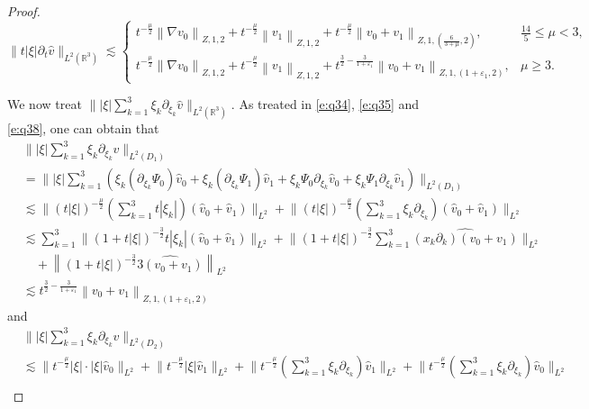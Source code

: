\documentclass[11pt,twoside]{article}
\newcommand{\R}{\mathbb R}
\newcommand{\p}{\partial}
\newcommand{\f}{\frac}
\newcommand{\ds}{\displaystyle}
\theoremstyle{plain}
\theoremstyle{definition}
\theoremstyle{remark}
\numberwithin{equation}{section}
\begin{document}
\begin{proof}
\begin{equation}\label{e:q83}
\|t|\xi|\p_t\hat{v}\|_{L^2(\R^3)}\lesssim \begin{cases}t^{-\f{\mu}{2}}\left\|\nabla v_0\right\|_{Z, 1,  2}+t^{-\f{\mu}{2}}\left\| v_1\right\|_{Z, 1,  2}+t^{-\f{\mu}{2}}\left\|v_0+v_1\right\|_{Z, 1,  (\f{6}{3+\mu},2)}, &  \f{14}{5}\leq\mu<3,  \\ t^{-\f{\mu}{2}}\left\|\nabla v_0\right\|_{Z, 1,  2}+t^{-\f{\mu}{2}}\left\| v_1\right\|_{Z, 1,  2}+t^{\f32-\f{3}{1+\varepsilon_1}}\left\|v_0+v_1\right\|_{Z, 1,  (1+\varepsilon_1,2)},
&  \mu\geq3.\end{cases}
\end{equation}


We now treat $\||\xi|\ds\sum_{k=1}^3\xi_k\p_{\xi_k}\hat{v}\|_{L^2(\R^3)}$.
As treated in \eqref{e:q34}, \eqref{e:q35} and \eqref{e:q38}, one can obtain that
\begin{equation}\label{e:q84}
\begin{aligned}
&\||\xi|\ds\sum_{k=1}^3\xi_k\p_{\xi_k}\hat{v}\|_{L^2(D_1)}
\\
&=\big\||\xi|  \ds\sum_{k=1}^{3}\left( \xi_k (\partial_{\xi_k} \Psi_0) \hat{v}_0
+ \xi_k (\partial_{\xi_k} \Psi_1) \hat{v}_1
+ \xi_k \Psi_0 \partial_{\xi_k} \hat{v}_0
+ \xi_k \Psi_1 \partial_{\xi_k} \hat{v}_1\right)\big\|_{L^2(D_1)}\\
&\lesssim \big\|(t|\xi|)^{-\frac{\mu}{2}}(\ds\sum_{k=1}^3t|\xi_k|)(\hat{v}_{0}+\hat{v}_{1})\big\|_{L^{2}}+ \big\|(t|\xi|)^{-\f{\mu}{2}}(\ds\sum_{k=1}^3\xi_k\p_{\xi_k})(\hat{v}_{0}+\hat{v}_{1})\big\|_{L^{2}}\\
& \lesssim \ds\sum_{k=1}^3 \big\|(1+t|\xi|)^{-\f{3}{2}}t|\xi_k|(\hat{v}_{0}+\hat{v}_{1})\big\|_{L^{2}}+
\big\|(1+t|\xi|)^{-\f{3}{2}}\ds\sum_{k=1}^3\widehat{(x_k\p_k)(v_0+v_1)}\big\|_{L^{2}}\\
&\quad+ \left\|(1+t|\xi|)^{-\f{3}{2}}\widehat{3(v_0+v_1)}\right\|_{L^{2}}\\
&\lesssim  t^{\f32-\f{3}{1+\varepsilon_1}}\left\|v_0+v_1\right\|_{Z, 1,(1+\varepsilon_1, 2)}
\end{aligned}
\end{equation}
and
\begin{equation}\label{e:q85}
\begin{aligned}
&\||\xi|\ds\sum_{k=1}^3\xi_k\p_{\xi_k}\hat{v}\|_{L^2(D_2)}\\
&\lesssim \big\|t^{-\frac{\mu}{2}}|\xi|\cdot|\xi|\hat{v}_{0}\big\|_{L^{2}}+ \big\|t^{-\frac{\mu}{2}}|\xi|\hat{v}_{1}\big\|_{L^{2}}+ \big\|t^{-\f{\mu}{2}}(\ds\sum_{k=1}^3\xi_k\p_{\xi_k})\hat{v}_{1}\big\|_{L^{2}} +\big\|t^{-\f{\mu}{2}}(\ds\sum_{k=1}^3\xi_k\p_{\xi_k})\hat{v}_{0}\big\|_{L^{2}}\\

\end{aligned}
\end{equation}
\end{proof}
\end{document}
